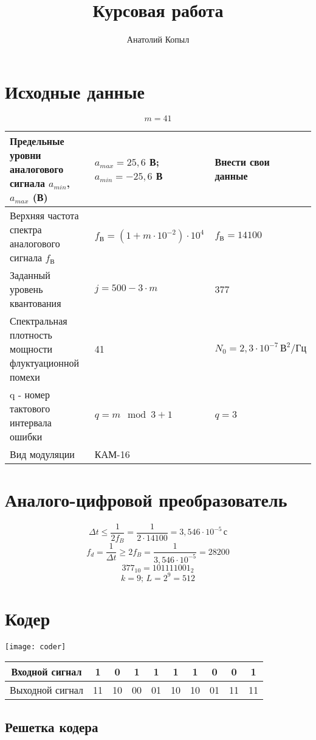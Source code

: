 \documentclass[a4paper, 12pt]{article}
\author{Анатолий Копыл}
\title{Курсовая работа}
\begin{document}
\section{Исходные данные}
\[ m=41 \]
\begin{center}
  \begin{tabular}{ | p{5cm} | p{5cm} | p{5cm} | } 
    \hline
    Предельные уровни аналогового сигнала \(a_{min}\), \(a_{max}\) (В) & \(a_{max}=25,6\) В;\newline\(a_{min}=-25,6\) В & Внести свои данные \\
    \hline
    Верхняя частота спектра аналогового сигнала \(f_В\) & \(f_В =(1+m\cdot 10^{-2})\cdot 10^4\) & \(f_В =14100\) \\ 
    \hline
    Заданный уровень квантования & \(j=500-3\cdot m\) & 377 \\
    \hline
    Спектральная плотность мощности флуктуационной помехи & 41 & \(N_0=2,3\cdot 10^{-7}\, В^2/Гц\)\\
    \hline
    q - номер тактового интервала ошибки & \(q=m\mod{3}+1\) & \(q=3\)\\
    \hline
    Вид модуляции & КАМ-16 & \\
    \hline
  \end{tabular}
\end{center}

\section{Аналого-цифровой преобразователь}
\[ \Delta t \leq \frac{1}{2f_B}=\frac1 {2\cdot 14100} = 3,546\cdot 10^{-5}\, с \]
\[ f_d=\frac{1}{\Delta t}\geq 2f_B=\frac{1}{3,546\cdot 10^{-5}}=28200 \]
\[ 377_{10}=101111001_2 \]
\[ k=9;\, L=2^9 = 512 \]

\section{Кодер}
\begin{center}
  \texttt{[image: coder]}

  \begin{tabular}{ | c | c | c | c | c | c | c | c | c | c | }
    \hline
    Входной сигнал &1&0&1&1&1&1&0&0&1\\
    \hline
    Выходной сигнал &11&10&00&01&10&10&01&11&11\\
    \hline
  \end{tabular}
\end{center}

\subsection{Решетка кодера}

\end{document}
